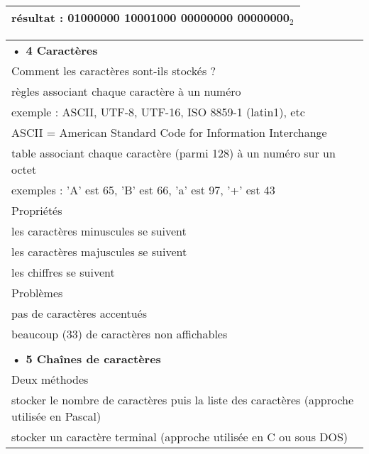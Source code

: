 \documentclass[5pt]{article}
\begin{document}
\begin{scriptsize}
\begin{tabularx}{0.5\linewidth}{|Y|}
résultat : 01000000 10001000 00000000 00000000$_{2}$
\\ \hline
\end{tabularx} 
\begin{tabularx}{0.5\linewidth}{|Y|}
\hline
\textbf{• 4 Caractères}
\\
Comment les caractères sont-ils stockés ? \\
règles associant chaque caractère à un numéro \\
exemple : ASCII, UTF-8, UTF-16, ISO 8859-1 (latin1), etc 
\\ASCII = American Standard Code for Information Interchange \\
table associant chaque caractère (parmi 128) à un numéro sur un octet \\
exemples : 'A' est 65, 'B' est 66, 'a' est 97, '+' est 43
\\
Propriétés \\
les caractères minuscules se suivent \\
les caractères majuscules se suivent \\
les chiffres se suivent \\Problèmes \\
pas de caractères accentués \\
beaucoup (33) de caractères non affichables\\
\\
\textbf{• 5 Chaînes de caractères}
\\
Deux méthodes \\
stocker le nombre de caractères puis la liste des caractères (approche utilisée en Pascal) \\
stocker un caractère terminal (approche utilisée en C ou sous DOS)
\\ \hline
\end{tabularx}

\end{scriptsize}
\end{document}
